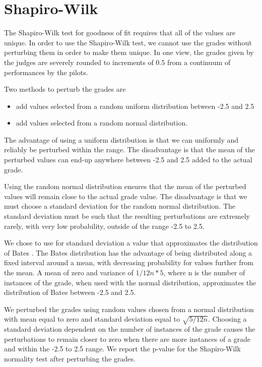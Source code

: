 \section{Shapiro-Wilk}

The Shapiro-Wilk test for goodness of fit requires that all of the values
are unique. In order to use the Shapiro-Wilk test, we
cannot use the grades without perturbing them in order to make them unique.
In one view, the grades given by the judges are severely rounded to increments
of 0.5 from a continuum of performances by the pilots.

Two methods to perturb the grades are
\begin{itemize}
\item add values selected from a random uniform distribution between -2.5 and
2.5
\item add values selected from a random normal distribution.
\end{itemize}

The advantage of using a uniform distribution is that we can uniformly and
reliably be perturbed within the range. The disadvantage is that the mean
of the perturbed values can end-up anywhere between -2.5 and 2.5 added to
the actual grade.

Using the random normal distribution ensures that the mean of the perturbed
values will remain close to the actual grade value. The disadvantage is that
we must choose a standard deviation for the random normal distribution.
The standard deviation must be such that the resulting perturbations are
extremely rarely, with very low probability, outside of the range -2.5 to
2.5.

We chose to use for standard deviation a value that approximates the
distribution of Bates \cite{Bates}. The Bates distribution has the
advantage of being distributed along a fixed interval around a mean, with
decreasing probability for values further from the mean.
A mean of zero and variance of $1/12n * 5$,
where n is the number of instances of the grade, when used
with the normal distribution, approximates the distribution of Bates between
-2.5 and 2.5.

We perturbed the grades using random values chosen from a normal distribution
with mean equal to zero and standard deviation equal to $\sqrt{5/12n}$.
Choosing a standard deviation dependent on the number of instances
of the grade causes the perturbations to remain closer to zero when there
are more instances of a grade and within the -2.5 to 2.5 range.
We report the p-value for the Shapiro-Wilk normality test after perturbing
the grades.
